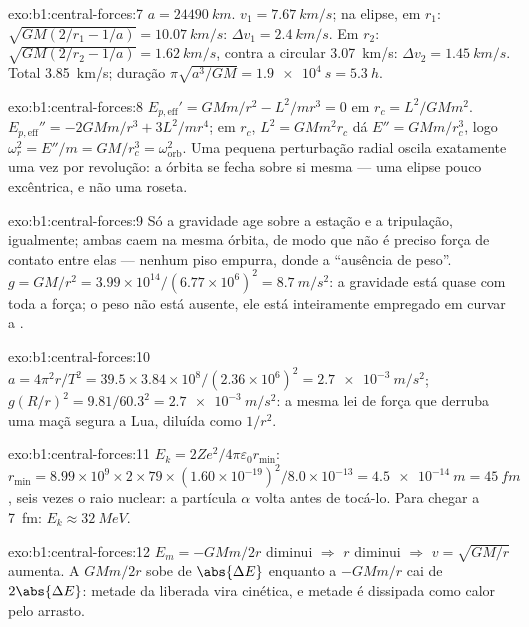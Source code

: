 \begin{solution}{exo:b1:central-forces:7}
$a = \qty{24490}{km}$. $v_1 = \qty{7.67}{km/s}$; na elipse, em $r_1$:
$\sqrt{GM(2/r_1 - 1/a)} = \qty{10.07}{km/s}$: $\Delta v_1 = \qty{2.4}{km/s}$.
Em $r_2$: $\sqrt{GM(2/r_2 - 1/a)} = \qty{1.62}{km/s}$, contra a circular
\qty{3.07}{km/s}: $\Delta v_2 = \qty{1.45}{km/s}$. Total \qty{3.85}{km/s};
duração $\pi\sqrt{a^3/GM} = \qty{1.9e4}{s} = \qty{5.3}{h}$.
\end{solution}

\begin{solution}{exo:b1:central-forces:8}
$E_{p,\mathrm{eff}}' = GMm/r^2 - L^2/mr^3 = 0$ em $r_c = L^2/GMm^2$.
$E_{p,\mathrm{eff}}'' = -2GMm/r^3 + 3L^2/mr^4$; em $r_c$, $L^2 = GMm^2r_c$
dá $E'' = GMm/r_c^3$, logo $\omega_r^2 = E''/m = GM/r_c^3 = \omega_{\text{orb}}^2$.
Uma pequena perturbação radial oscila exatamente uma vez por revolução: a
órbita se fecha sobre si mesma --- uma elipse pouco excêntrica, e não uma roseta.
\end{solution}

\begin{solution}{exo:b1:central-forces:9}
Só a gravidade age sobre a estação e a tripulação, igualmente; ambas caem na mesma
órbita, de modo que não é preciso força de contato entre elas --- nenhum piso empurra,
donde a ``ausência de peso''. $g = GM/r^2 = 3.99\times10^{14}/(6.77\times10^6)^2
= \qty{8.7}{m/s^2}$: a gravidade está quase com toda a força; o peso não está
ausente, ele está inteiramente empregado em curvar a .
\end{solution}

\begin{solution}{exo:b1:central-forces:10}
$a = 4\pi^2r/T^2 = 39.5 \times 3.84\times10^8/(2.36\times10^6)^2 =
\qty{2.7e-3}{m/s^2}$; $g(R/r)^2 = 9.81/60.3^2 = \qty{2.7e-3}{m/s^2}$: a
mesma lei de força que derruba uma maçã segura a Lua, diluída como $1/r^2$.
\end{solution}

\begin{solution}{exo:b1:central-forces:11}
$E_k = 2Ze^2/4\pi\varepsilon_0r_{\min}$: $r_{\min} = 8.99\times10^9 \times 2 \times 79
\times (1.60\times10^{-19})^2/8.0\times10^{-13} = \qty{4.5e-14}{m} = \qty{45}{fm}$,
seis vezes o raio nuclear: a partícula $\alpha$ volta antes de tocá-lo.
Para chegar a \qty{7}{fm}: $E_k \approx \qty{32}{MeV}$.
\end{solution}

\begin{solution}{exo:b1:central-forces:12}
$E_m = -GMm/2r$ diminui $\Rightarrow$ $r$ diminui $\Rightarrow$ $v =
\sqrt{GM/r}$ aumenta. A  $GMm/2r$ sobe de $\abs{\Delta E}$
enquanto a  $-GMm/r$ cai de $2\abs{\Delta E}$: metade da
 liberada vira cinética, e metade é dissipada como calor
pelo arrasto.
\end{solution}

